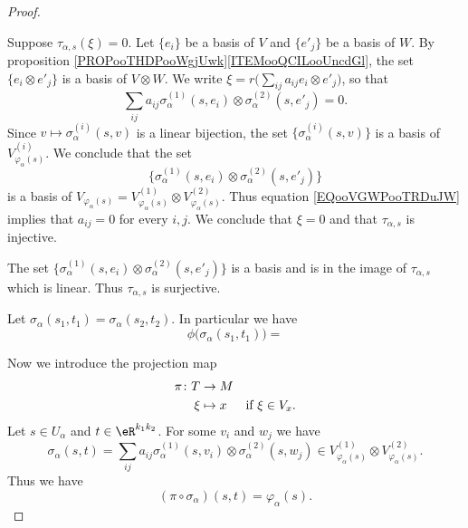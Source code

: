\begin{proof}
\begin{subproof}
		Suppose \( \tau_{\alpha,s}(\xi)=0\). Let \( \{e_i\}\) be a basis of \( V\) and \( \{e'_j\}\) be a basis of \( W\). By proposition \ref{PROPooTHDPooWgjUwk}\ref{ITEMooQCILooUncdGl}, the set \( \{e_i\otimes e'_j\}\) is a basis of \( V\otimes W\). We write \( \xi=r\big( \sum_{ij}a_{ij}e_i\otimes e'_j \big)\), so that
		\begin{equation}		\label{EQooVGWPooTRDuJW}
			\sum_{ij}a_{ij}\sigma_{\alpha}^{(1)}(s,e_i)\otimes \sigma_{\alpha}^{(2)}(s,e'_j)=0.
		\end{equation}
		Since \( v\mapsto \sigma_{\alpha}^{(i)}(s,v)\) is a linear bijection, the set \( \{ \sigma_{\alpha}^{(i)}(s,v) \}\) is a basis of \( V_{\varphi_{\alpha}(s)}^{(i)}\). We conclude that the set
		\begin{equation}
			\{ \sigma_{\alpha}^{(1)}(s,e_i)\otimes \sigma_{\alpha}^{(2)}(s,e'_j) \}
		\end{equation}
		is a basis of \( V_{\varphi_{\alpha}(s)}=V_{\varphi_{\alpha}(s)}^{(1)}\otimes V_{\varphi_{\alpha}(s)}^{(2)}\). Thus equation \eqref{EQooVGWPooTRDuJW} implies that \( a_{ij}=0\) for every \( i,j\). We conclude that \( \xi=0\) and that \( \tau_{\alpha,s}\) is injective.

		The set \(			\{ \sigma_{\alpha}^{(1)}(s,e_i)\otimes \sigma_{\alpha}^{(2)}(s,e'_j) \}  \) is a basis and is in the image of \( \tau_{\alpha,s}\) which is linear. Thus \( \tau_{\alpha,s}\) is surjective.

				\label{ITEMooXSPDooKMXlBN}
		Let \( \sigma_{\alpha}(s_1,t_1)=\sigma_{\alpha}(s_2,t_2)\). In particular we have
		\begin{equation}
			\phi\big( \sigma_{\alpha}(s_1,t_1) \big)=
		\end{equation}
	\end{subproof}

	Now we introduce the projection map
	\begin{equation}
		\begin{aligned}
			\pi\colon T & \to M                                  \\
			\xi         & \mapsto x & \text{if \( \xi\in V_x\)}.
		\end{aligned}
	\end{equation}
	Let \( s\in U_{\alpha}\) and \( t\in \eR^{k_1k_2}\). For some \( v_i\) and \( w_j\) we have
	\begin{equation}
		\sigma_{\alpha}(s,t)=\sum_{ij}a_{ij}\sigma_{\alpha}^{(1)}(s,v_i)\otimes\sigma_{\alpha}^{(2)}(s,w_j)\in V_{\varphi_{\alpha}(s)}^{(1)}\otimes V_{\varphi_{\alpha}(s)}^{(2)}.
	\end{equation}
	Thus we have
	\begin{equation}		\label{EQooRSRJooWNtWIA}
		(\pi\circ\sigma_{\alpha})(s,t)=\varphi_{\alpha}(s).
	\end{equation}


\end{proof}
